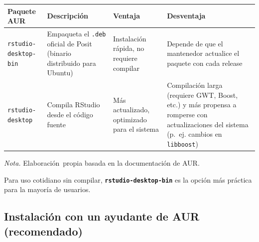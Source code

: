 \documentclass[
  man,
  floatsintext,
  longtable,
  a4paper,
  nolmodern,
  notxfonts,
  notimes,
  12pt,
  colorlinks=true,linkcolor=blue,citecolor=blue,urlcolor=blue]{apa7}
\newcounter{none} %
\begin{document}
\begin{table}

{\caption{{Opciones disponibles en AUR para
RStudio}{\label{tbl-aur-options}}}
\vspace{-20pt}}

{\def\LTcaptype{none} %
\begin{longtable}[]{@{}
  >{\raggedright\arraybackslash}p{}
  >{\raggedright\arraybackslash}p{}
  >{\raggedright\arraybackslash}p{}
  >{\raggedright\arraybackslash}p{}@{}}
\toprule\noalign{}
\begin{minipage}[b]{\linewidth}\raggedright
Paquete AUR
\end{minipage} & \begin{minipage}[b]{\linewidth}\raggedright
Descripción
\end{minipage} & \begin{minipage}[b]{\linewidth}\raggedright
Ventaja
\end{minipage} & \begin{minipage}[b]{\linewidth}\raggedright
Desventaja
\end{minipage} \\
\midrule\noalign{}
\endhead
\bottomrule\noalign{}
\endlastfoot
\texttt{rstudio-desktop-bin} & Empaqueta el \texttt{.deb} oficial de
Posit (binario distribuido para Ubuntu) & Instalación rápida, no
requiere compilar & Depende de que el mantenedor actualice el paquete
con cada release \\
\texttt{rstudio-desktop} & Compila RStudio desde el código fuente & Más
actualizado, optimizado para el sistema & Compilación larga (requiere
GWT, Boost, etc.) y más propensa a romperse con actualizaciones del
sistema (p.~ej. cambios en \texttt{libboost}) \\
\end{longtable}
}

\vspace{-20pt}
\noindent \emph{Nota.} Elaboración~propia basada en la documentación de
AUR.

\end{table}

Para uso cotidiano sin compilar, \textbf{\texttt{rstudio-desktop-bin}}
es la opción más práctica para la mayoría de usuarios.

\subsection{Instalación con un ayudante de AUR
(recomendado)}\label{instalaciuxf3n-con-un-ayudante-de-aur-recomendado}
\end{document}
